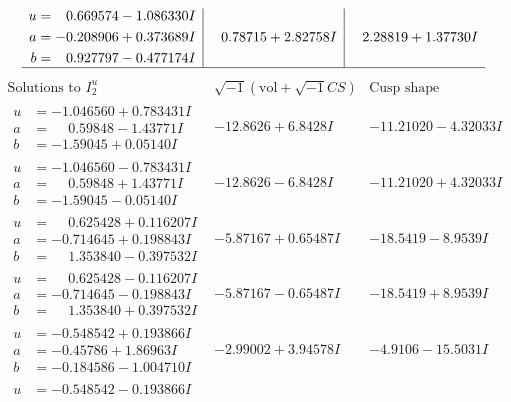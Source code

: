 \documentclass[1p]{elsarticle_modified}
\theoremstyle{definition}
\newcommand{\I}{\sqrt{-1}}
\begin{document}
$$\begin{array}{c|c|c}
\begin{aligned}
u &= \phantom{-}0.669574 - 1.086330 I \\
a &= -0.208906 + 0.373689 I \\
b &= \phantom{-}0.927797 - 0.477174 I\end{aligned}
 & \phantom{-}0.78715 + 2.82758 I & \phantom{-}2.28819 + 1.37730 I\\
 \hline 
 \end{array}$$\newpage$$\begin{array}{c|c|c}  
\text{Solutions to }I^u_{2}& \I (\text{vol} + \sqrt{-1}CS) & \text{Cusp shape}\\
 \hline 
\begin{aligned}
u &= -1.046560 + 0.783431 I \\
a &= \phantom{-}0.59848 - 1.43771 I \\
b &= -1.59045 + 0.05140 I\end{aligned}
 & -12.8626 + 6.8428 I & -11.21020 - 4.32033 I \\ \hline\begin{aligned}
u &= -1.046560 - 0.783431 I \\
a &= \phantom{-}0.59848 + 1.43771 I \\
b &= -1.59045 - 0.05140 I\end{aligned}
 & -12.8626 - 6.8428 I & -11.21020 + 4.32033 I \\ \hline\begin{aligned}
u &= \phantom{-}0.625428 + 0.116207 I \\
a &= -0.714645 + 0.198843 I \\
b &= \phantom{-}1.353840 - 0.397532 I\end{aligned}
 & -5.87167 + 0.65487 I & -18.5419 - 8.9539 I \\ \hline\begin{aligned}
u &= \phantom{-}0.625428 - 0.116207 I \\
a &= -0.714645 - 0.198843 I \\
b &= \phantom{-}1.353840 + 0.397532 I\end{aligned}
 & -5.87167 - 0.65487 I & -18.5419 + 8.9539 I \\ \hline\begin{aligned}
u &= -0.548542 + 0.193866 I \\
a &= -0.45786 + 1.86963 I \\
b &= -0.184586 - 1.004710 I\end{aligned}
 & -2.99002 + 3.94578 I & -4.9106 - 15.5031 I \\ \hline\begin{aligned}
u &= -0.548542 - 0.193866 I \\

\end{aligned}
\end{array}$$
\end{document}
